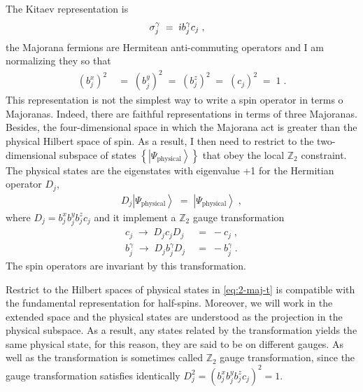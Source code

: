 The Kitaev representation is 
\begin{align}
    \sigma^{\gamma}_{j} \; & = \; \dot{\imath} b^{\gamma}_{j} c_{j} \; ,  \label{eq:2-maj-t}
\end{align}
the Majorana fermions are Hermitean anti-commuting operators and I am normalizing they so that
\begin{align}
    ( b^{x}_{j} )^2 \; &= \;   ( b^{y}_{j} )^2 \; = \;  ( b^{z}_{j} )^2 \; = \;  (c_{j} )^2  \; = \; 1 \; . 
\end{align}
This representation is not the simplest way to write a spin operator in terms o Majoranas. Indeed, there are faithful representations in terms of three Majoranas. Besides, the four-dimensional space in which the Majorana act is greater than the physical Hilbert space of spin. As a result, I then need to restrict to the two-dimensional subspace of states $\left\{  \left\vert \Psi_{\text{physical}} \right\rangle \right\} $  that obey the local $\mathbb{Z}_2$ constraint. The physical states are the eigenstates with eigenvalue +1 for the Hermitian operator $D_j$,
\begin{align}
    D_{j} \left\vert \Psi_{\text{physical}} \right\rangle  \; = \;%
    \left\vert \Psi_{\text{physical}} \right\rangle  \; , \label{eq:2-gauge-operator}
\end{align}
where $D_{j} = b^{x}_{j} b^{y}_{j} b^{z}_{j} c_{j}$ and it implement a $\mathbb{Z}_2$ gauge transformation
\begin{equation}
    \begin{split}
            c_j \; \longrightarrow \;  D_{j} c_j D_{j} \; &= \; - c_j \; ,  \\
    b^{\gamma}_j \; \longrightarrow \;  D_{j} b^{\gamma}_j D_{j} \; &= \; - b^{\gamma}_j \; .
    \end{split} \label{eq:2-gauge-trans}
\end{equation}
The spin operators are invariant by this transformation.

Restrict to the Hilbert spaces of physical states in \eqref{eq:2-maj-t} is compatible with the fundamental representation for half-spins. %
Moreover, we will work in the extended space and the physical states are understood as the projection in the physical subspace. As a result, any states related by the transformation yields the same physical state, for this reason, they are said to be on different gauges. As well as the transformation is sometimes called $\mathbb{Z}_2$ gauge transformation, since the gauge transformation satisfies identically $D_j^2 =(b^{x}_{j} b^{y}_{j} b^{z}_{j}  c_{j})^2 = 1$.


